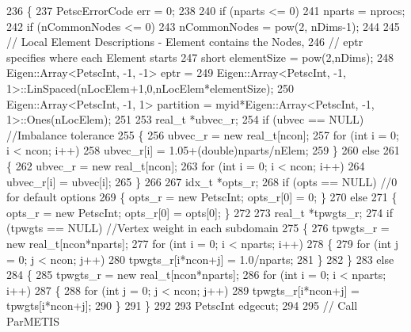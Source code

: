 \begin{DoxyCode}
236 \{
237   PetscErrorCode err = 0;
238 
240   \textcolor{keywordflow}{if} (nparts <= 0)
241     nparts = nprocs;
242   \textcolor{keywordflow}{if} (nCommonNodes <= 0)
243     nCommonNodes = pow(2, nDims-1);
244 
245   \textcolor{comment}{// Local Element Descriptions - Element contains the Nodes,}
246   \textcolor{comment}{// eptr specifies where each Element starts}
247   \textcolor{keywordtype}{short} elementSize = pow(2,nDims);
248   Eigen::Array<PetscInt, -1, -1> eptr =
249     Eigen::Array<PetscInt, -1, 1>::LinSpaced(nLocElem+1,0,nLocElem*elementSize);
250   Eigen::Array<PetscInt, -1, 1> partition = myid*Eigen::Array<PetscInt, -1, 1>::Ones(nLocElem);
251 
253   real\_t *ubvec\_r;
254   \textcolor{keywordflow}{if} (ubvec == NULL)                            \textcolor{comment}{//Imbalance tolerance}
255   \{
256     ubvec\_r = \textcolor{keyword}{new} real\_t[ncon];
257     \textcolor{keywordflow}{for} (\textcolor{keywordtype}{int} i = 0; i < ncon; i++)
258       ubvec\_r[i] = 1.05+(\textcolor{keywordtype}{double})nparts/nElem;
259   \}
260   \textcolor{keywordflow}{else}
261   \{
262     ubvec\_r = \textcolor{keyword}{new} real\_t[ncon];
263     \textcolor{keywordflow}{for} (\textcolor{keywordtype}{int} i = 0; i < ncon; i++)
264       ubvec\_r[i] = ubvec[i];
265   \}
266 
267   idx\_t *opts\_r;
268   \textcolor{keywordflow}{if} (opts == NULL)                         \textcolor{comment}{//0 for default options}
269   \{ opts\_r = \textcolor{keyword}{new} PetscInt; opts\_r[0] = 0; \}
270   \textcolor{keywordflow}{else}
271   \{ opts\_r = \textcolor{keyword}{new} PetscInt; opts\_r[0] = opts[0]; \}
272 
273   real\_t *tpwgts\_r;
274   \textcolor{keywordflow}{if} (tpwgts == NULL)                \textcolor{comment}{//Vertex weight in each subdomain}
275   \{
276     tpwgts\_r = \textcolor{keyword}{new} real\_t[ncon*nparts];
277     \textcolor{keywordflow}{for} (\textcolor{keywordtype}{int} i = 0; i < nparts; i++)
278     \{
279       \textcolor{keywordflow}{for} (\textcolor{keywordtype}{int} j = 0; j < ncon; j++)
280         tpwgts\_r[i*ncon+j] = 1.0/nparts;
281     \}
282   \}
283   \textcolor{keywordflow}{else}
284   \{
285     tpwgts\_r = \textcolor{keyword}{new} real\_t[ncon*nparts];
286     \textcolor{keywordflow}{for} (\textcolor{keywordtype}{int} i = 0; i < nparts; i++)
287     \{
288       \textcolor{keywordflow}{for} (\textcolor{keywordtype}{int} j = 0; j < ncon; j++)
289         tpwgts\_r[i*ncon+j] = tpwgts[i*ncon+j];
290     \}
291   \}
292 
293   PetscInt edgecut;
294 
295   \textcolor{comment}{// Call ParMETIS}

\end{DoxyCode}
